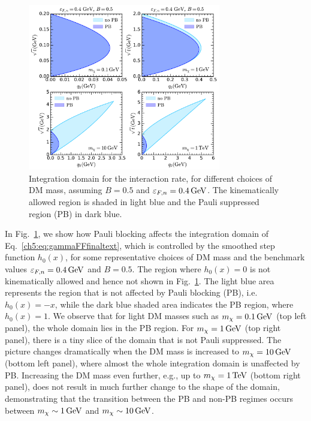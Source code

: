 \begin{figure}[t!bp] 
   \centering
   \includegraphics[width=0.75\textwidth]{capture_3/C_int_domain_mdm.pdf}
   \caption{Integration domain for the interaction rate, for different choices of DM mass, assuming   
     $B=0.5$ and $\varepsilon_{F,n}=0.4{\rm \,GeV}$. The kinematically allowed region is shaded in light blue and the Pauli suppressed region (PB) in dark blue. 
   }
   \label{ch5:fig:intC}
   \end{figure}
   
   
In Fig.~\ref{ch5:fig:intC}, we show how Pauli blocking affects the integration domain of Eq.~\ref{ch5:eq:gammaFFfinaltext}, which is controlled by the smoothed step function $h_0(x)$, for some representative choices of DM mass and the benchmark values $\varepsilon_{F,n}=0.4{\rm \,GeV}$ and $B=0.5$.  The region where $h_0(x)=0$ is not kinematically allowed and hence not shown in Fig.~\ref{ch5:fig:intC}.
The light blue area represents the region that is not affected by Pauli blocking (PB), i.e. $h_0(x)=-x$, while the dark blue shaded area indicates the PB region, where $h_0(x)=1$. 
We observe that for light DM masses such as  $m_\chi=0.1{\rm \,GeV}$ (top left panel), the whole domain lies in the PB region. For $m_\chi=1{\rm \,GeV}$ (top right panel), there is a tiny slice of the domain that is not Pauli suppressed. The picture changes dramatically when the DM mass is increased to $m_\chi=10{\rm \,GeV}$ (bottom left panel), where almost the whole integration domain is unaffected by PB. Increasing the DM mass even further, e.g., up to $m_\chi=1{\rm \,TeV}$ (bottom right panel), does not result in much further change to the shape of the domain, demonstrating that the transition between the PB and non-PB regimes occurs between $m_\chi\sim1{\rm \,GeV}$ and $m_\chi\sim10{\rm \,GeV}$.
   


